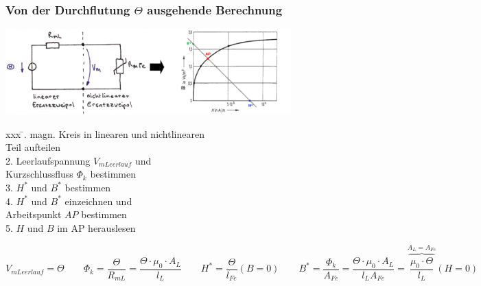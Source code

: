 \subsubsection{Von der Durchflutung $\Theta$ ausgehende Berechnung}
\begin{minipage}{11cm}
	\includegraphics[width=11cm]{./bilder/magnetischerkreis2.png}
\end{minipage}
\hfill
\begin{minipage}{7cm}
\begin{tabbing}
xxx \= . \> magn. Kreis in linearen und nichtlinearen\\
   \> Teil aufteilen\\
2. \> Leerlaufspannung $V_{mLeerlauf}$ und\\
   \> Kurzschlussfluss $\Phi_k$ bestimmen\\
3. \> $H^*$ und $B^*$ bestimmen\\
4. \> $H^*$ und $B^*$ einzeichnen und\\
   \> Arbeitspunkt $AP$ bestimmen\\
5. \> $H$ und $B$ im AP herauslesen
\end{tabbing}
\end{minipage}
$$V_{mLeerlauf}=\Theta \qquad \Phi_k=\frac{\Theta}{R_{mL}}=\frac{\Theta \cdot
\mu_0 \cdot A_L }{l_L} \qquad H^*=\frac{\Theta}{l_{Fe}} (B = 0) \qquad B^*=\frac{\Phi_k}{A_{Fe}}=\frac{\Theta \cdot
\mu_0 \cdot A_L }{l_L A_{Fe}}=\overbrace{\frac{\mu_0 \cdot
\Theta}{l_L}}^{A_L=A_{Fe}}(H=0)$$


